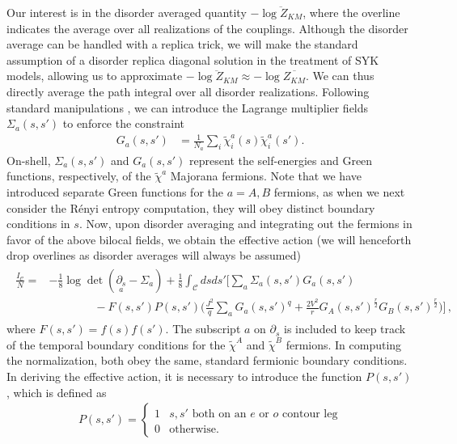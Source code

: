 \documentclass[reprint, floatfix,eqsecnum,superscriptaddress,preprint,nofootinbib,onecolumn,amsmath,amssymb,aps,prb]{revtex4-2}
\newcommand{\tchi}{\tilde{\chi}}
\begin{document}
Our interest is in the disorder averaged quantity $-\overline{\log Z_{KM}}$, where the overline indicates the average over all realizations of the couplings. Although the disorder average can be handled with a replica trick, we will make the standard assumption of a disorder replica diagonal solution in the treatment of SYK models, allowing
us to approximate $-\overline{\log Z_{KM}} \approx -\log \overline{Z_{KM}}$. 
We can thus directly average the path integral over all disorder realizations. Following standard manipulations \cite{Maldacena2016}, we can introduce the Lagrange multiplier fields $\Sigma_a(s,s')$ to enforce the constraint
\begin{align}
    G_a(s,s') &= \frac{1}{N_a}\sum_i \tchi_i^a(s) \tchi_i^a(s').
\end{align}
On-shell, $\Sigma_a(s,s')$ and $G_a(s,s')$ represent the self-energies and Green functions, respectively, of the $\tchi^a$ Majorana fermions. Note that we have introduced separate Green functions for the $a=A,B$ fermions, as when we next consider the R\'enyi entropy computation, they will obey distinct boundary conditions in $s$. Now, upon disorder averaging and integrating out the fermions in favor of the above bilocal fields, we obtain the effective action (we will henceforth drop overlines as disorder averages will always be assumed)
\begin{align}
    \begin{split}
	\frac{I_{\mathcal{C}}}{N} =  &-\frac{1}{8} \log \det \left(  \underset{a}{\partial_s} - \Sigma_{a}  \right) + \frac{1}{8}\int_{\mathcal{C}} ds ds'  \Bigg[ \sum_{a} \Sigma_{a}(s,s') G_{a}(s,s') \\
	&\qquad\qquad - F(s,s')P(s,s') \Bigg( \frac{J^2}{q} \sum_{a} G_{a}(s,s')^q  + \frac{2V^2}{r} G_A(s,s')^{\frac{r}{2}} G_B(s,s')^{\frac{r}{2}} \Bigg) \Bigg] \, ,\end{split}
	\label{eqn:km-action}
\end{align}
where $F(s,s')=f(s)f(s')$. The subscript $a$ on $\partial_s$ is included to keep track of the temporal boundary conditions for the $\tchi^A$ and $\tchi^B$ fermions. In computing the normalization, both obey the same, standard fermionic boundary conditions. %
In deriving the effective action, it is necessary to introduce the function $P(s,s')$, which is defined as
\begin{align}
    P(s,s') = \begin{cases}
    1 & s,s' \text{ both on an }e \text{ or } o \text{ contour leg} \\
    0 & \text{otherwise}.
    \end{cases}
\end{align}
\end{document}
